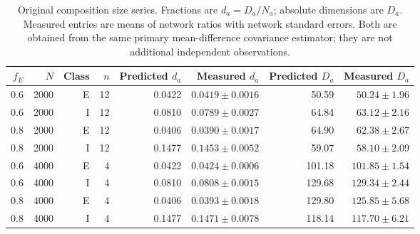 \begin{table}[htp]
\centering
\small
\caption{Original composition size series. Fractions are
$d_a=D_a/N_a$; absolute dimensions are $D_a$. Measured entries are means of
network ratios with network standard errors. Both are obtained from the
same primary mean-difference covariance estimator; they are not additional
independent observations.}
\label{tab:population_dimensions}
\begin{tabular}{rrrrrrrr}
\toprule
$f_E$&$N$&Class&$n$&Predicted $d_a$&Measured $d_a$&Predicted $D_a$&Measured $D_a$\\
\midrule
0.6&2000&E&12&0.0422&$0.0419\pm0.0016$&50.59&$50.24\pm1.96$\\
0.6&2000&I&12&0.0810&$0.0789\pm0.0027$&64.84&$63.12\pm2.16$\\
0.8&2000&E&12&0.0406&$0.0390\pm0.0017$&64.90&$62.38\pm2.67$\\
0.8&2000&I&12&0.1477&$0.1453\pm0.0052$&59.07&$58.10\pm2.09$\\
0.6&4000&E&4&0.0422&$0.0424\pm0.0006$&101.18&$101.85\pm1.54$\\
0.6&4000&I&4&0.0810&$0.0808\pm0.0015$&129.68&$129.34\pm2.44$\\
0.8&4000&E&4&0.0406&$0.0393\pm0.0018$&129.80&$125.85\pm5.68$\\
0.8&4000&I&4&0.1477&$0.1471\pm0.0078$&118.14&$117.70\pm6.21$\\
\bottomrule
\end{tabular}
\end{table}
